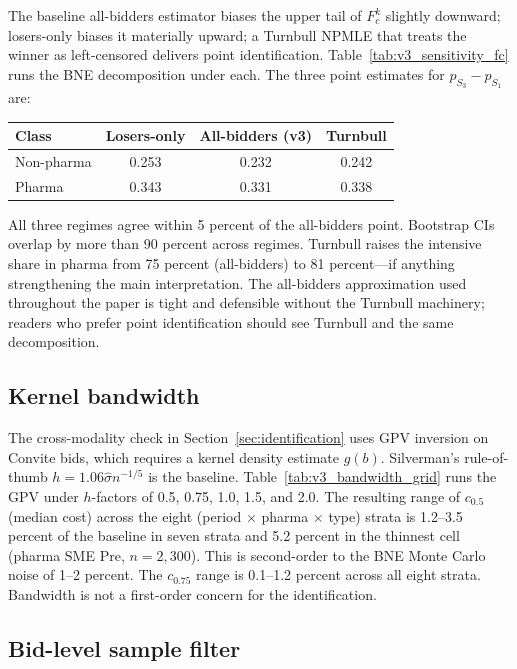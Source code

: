 The baseline all-bidders estimator biases the upper tail of $F_c^k$ slightly downward; losers-only biases it materially upward; a Turnbull NPMLE that treats the winner as left-censored delivers point identification. Table~\ref{tab:v3_sensitivity_fc} runs the BNE decomposition under each. The three point estimates for $p_{S_3} - p_{S_1}$ are:
\begin{center}
\begin{tabular}{lccc}
\toprule
Class      & Losers-only & All-bidders (v3) & Turnbull \\
\midrule
Non-pharma & 0.253 & 0.232 & 0.242 \\
Pharma     & 0.343 & 0.331 & 0.338 \\
\bottomrule
\end{tabular}
\end{center}
All three regimes agree within 5 percent of the all-bidders point. Bootstrap CIs overlap by more than 90 percent across regimes. Turnbull raises the intensive share in pharma from 75 percent (all-bidders) to 81 percent---if anything strengthening the main interpretation. The all-bidders approximation used throughout the paper is tight and defensible without the Turnbull machinery; readers who prefer point identification should see Turnbull and the same decomposition.

\subsection{Kernel bandwidth}

The cross-modality check in Section~\ref{sec:identification} uses GPV inversion on Convite bids, which requires a kernel density estimate $g(b)$. Silverman's rule-of-thumb $h = 1.06 \hat\sigma n^{-1/5}$ is the baseline. Table~\ref{tab:v3_bandwidth_grid} runs the GPV under $h$-factors of 0.5, 0.75, 1.0, 1.5, and 2.0. The resulting range of $c_{0.5}$ (median cost) across the eight (period $\times$ pharma $\times$ type) strata is 1.2--3.5 percent of the baseline in seven strata and 5.2 percent in the thinnest cell (pharma SME Pre, $n = 2{,}300$). This is second-order to the BNE Monte Carlo noise of 1--2 percent. The $c_{0.75}$ range is 0.1--1.2 percent across all eight strata. Bandwidth is not a first-order concern for the identification.

\subsection{Bid-level sample filter}

